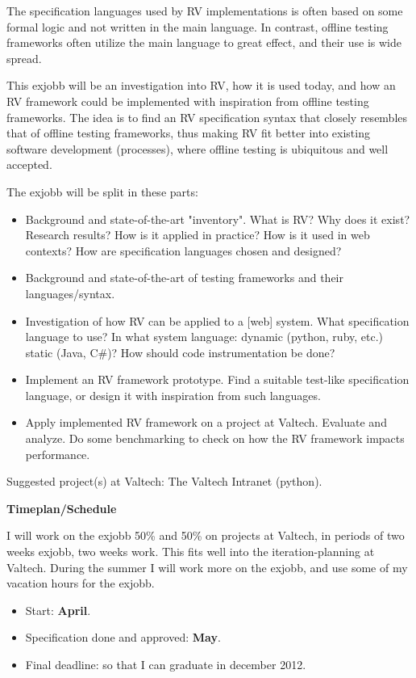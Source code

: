 \documentclass[a4paper,11pt]{kth-mag}
\begin{document}
The specification languages used by RV implementations is often based
on some formal logic and not written in the main language. In contrast,
offline testing frameworks often utilize the main language to great effect,
and their use is wide spread.

This exjobb will be an investigation into RV, how it is used today, and how an
RV framework could be implemented with inspiration from offline testing
frameworks. The idea is to find an RV specification syntax that closely
resembles that of offline testing frameworks, thus making RV fit better into
existing software development (processes), where offline testing is ubiquitous
and well accepted.

The exjobb will be split in these parts:

\begin{itemize}
	\item Background and state-of-the-art "inventory". What is RV? Why does it
        exist? Research results? How is it applied in practice? How is it used
        in web contexts? How are specification languages chosen and designed?
	\item Background and state-of-the-art of testing frameworks and their
        languages/syntax.
	\item Investigation of how RV can be applied to a [web] system. What
        specification language to use? In what system language: dynamic
        (python, ruby, etc.) static (Java, C\#)? How should code
        instrumentation be done?
	\item Implement an RV framework prototype. Find a suitable test-like
        specification language, or design it with inspiration from such
        languages.
	\item Apply implemented RV framework on a project at Valtech. Evaluate and
        analyze. Do some benchmarking to check on how the RV framework impacts
        performance.
\end{itemize}

Suggested project(s) at Valtech: The Valtech Intranet (python).

\textbf{Timeplan/Schedule}

I will work on the exjobb 50\% and 50\% on projects at Valtech, in periods of
two weeks exjobb, two weeks work. This fits well into the iteration-planning at
Valtech. During the summer I will work more on the exjobb, and use some of my
vacation hours for the exjobb.

\begin{itemize}
	\item Start: \textbf{April}.
    \item Specification done and approved: \textbf{May}.
	\item Final deadline: so that I can graduate in december 2012.
\end{itemize}
\end{document}
